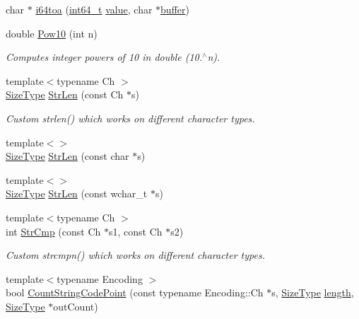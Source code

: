 \begin{DoxyCompactItemize}
\item 
char $\ast$ \hyperlink{namespaceinternal_a51566359e64c9746656c396c63a23d61}{i64toa} (\hyperlink{stdint_8h_a414156feea104f8f75b4ed9e3121b2f6}{int64\+\_\+t} \hyperlink{imgui__impl__opengl3__loader_8h_a32aff7c6c4cd253fdf6563677afab5ce}{value}, char $\ast$\hyperlink{imgui__impl__opengl3__loader_8h_a3667f558219c90437106b544a3ca00b8}{buffer})
\item 
double \hyperlink{namespaceinternal_af01c41d045d596e2f8d1888cf6fbecb6}{Pow10} (int n)
\begin{DoxyCompactList}\small\item\em Computes integer powers of 10 in double (10.$^\wedge$n). \end{DoxyCompactList}\item 
{\footnotesize template$<$typename Ch $>$ }\\\hyperlink{rapidjson_8h_a5ed6e6e67250fadbd041127e6386dcb5}{Size\+Type} \hyperlink{namespaceinternal_a86326fb0c9d7c7ea8edd7deedbb2b26e}{Str\+Len} (const Ch $\ast$s)
\begin{DoxyCompactList}\small\item\em Custom strlen() which works on different character types. \end{DoxyCompactList}\item 
{\footnotesize template$<$$>$ }\\\hyperlink{rapidjson_8h_a5ed6e6e67250fadbd041127e6386dcb5}{Size\+Type} \hyperlink{namespaceinternal_ac61f7d1bfae1fb68526633edd418fa1c}{Str\+Len} (const char $\ast$s)
\item 
{\footnotesize template$<$$>$ }\\\hyperlink{rapidjson_8h_a5ed6e6e67250fadbd041127e6386dcb5}{Size\+Type} \hyperlink{namespaceinternal_a9cd1cee166f1e18e117d3ce9dc1c83da}{Str\+Len} (const wchar\+\_\+t $\ast$s)
\item 
{\footnotesize template$<$typename Ch $>$ }\\int \hyperlink{namespaceinternal_a8986308d308f29092fef8a82e64debef}{Str\+Cmp} (const Ch $\ast$s1, const Ch $\ast$s2)
\begin{DoxyCompactList}\small\item\em Custom strcmpn() which works on different character types. \end{DoxyCompactList}\item 
{\footnotesize template$<$typename Encoding $>$ }\\bool \hyperlink{namespaceinternal_a864bf0d412431b387aeeee9efdf0adfc}{Count\+String\+Code\+Point} (const typename Encoding\+::\+Ch $\ast$s, \hyperlink{rapidjson_8h_a5ed6e6e67250fadbd041127e6386dcb5}{Size\+Type} \hyperlink{imgui__impl__opengl3__loader_8h_a011fc24f10426c01349e94a4edd4b0d5}{length}, \hyperlink{rapidjson_8h_a5ed6e6e67250fadbd041127e6386dcb5}{Size\+Type} $\ast$out\+Count)

\end{DoxyCompactItemize}
